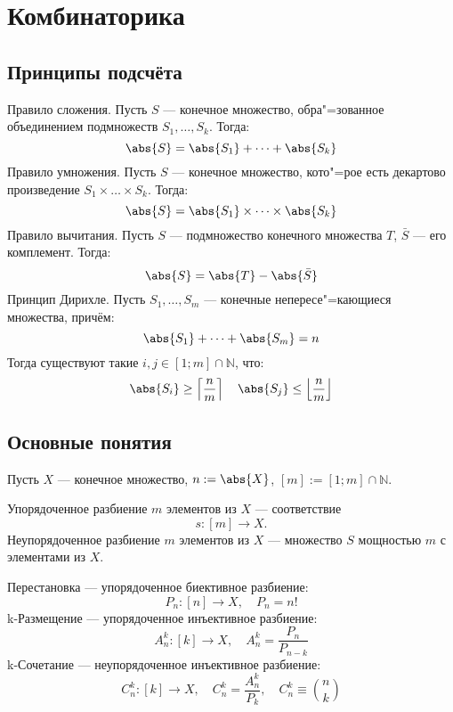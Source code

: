 \section{Комбинаторика}





\subsection{Принципы подсчёта}

{\bold Правило сложения.} Пусть $S$ --- конечное множество, обра"=зованное объединением подмножеств $S_1,\dots,S_k$. Тогда:
$$\abs{S}=\abs{S_1}+\dots+\abs{S_k}$$
{\bold Правило умножения.} Пусть $S$ --- конечное множество, кото"=рое есть декартово произведение $S_1\times\dots\times S_k$. Тогда:
$$\abs{S}=\abs{S_1}\times\dots\times\abs{S_k}$$
{\bold Правило вычитания.} Пусть $S$ --- подмножество конечного множества $T$, $\bar{S}$ --- его комплемент. Тогда:
$$\abs{S}=\abs{T}-\abs{\bar{S}}$$
{\bold Принцип Дирихле.} Пусть $S_1,\dots,S_m$ --- конечные непересе"=кающиеся множества, причём:
$$\abs{S_1}+\dots+\abs{S_m}=n$$
Тогда существуют такие $i,j\in[1;m]\cap\mathbb{N}$, что:
$$\abs{S_i}\geq\left\lceil\frac{n}{m}\right\rceil\quad\abs{S_j}\leq\left\lfloor\frac{n}{m}\right\rfloor$$

\subsection{Основные понятия}

Пусть $X$ --- конечное множество, $n:=\abs{X}$, $[m]:=[1;m]\cap\mathbb{N}$.

{\ital Упорядоченное разбиение} $m$ элементов из $X$ --- соответствие
$$s\colon[m]\to X.$$
{\ital Неупорядоченное разбиение} $m$ элементов из $X$ --- множество $S$ мощностью $m$ с элементами из $X$.

{\ital Перестановка} --- упорядоченное биективное разбиение:
$$P_n\colon[n]\to X,\quad P_n=n!$$
{\ital k-Размещение} --- упорядоченное инъективное разбиение:
$$A_n^k\colon[k]\to X,\quad A_n^k=\frac{P_n}{P_{n-k}}$$
{\ital k-Сочетание} --- неупорядоченное инъективное разбиение:
$$C_n^k\colon[k]\to X,\quad C_n^k=\frac{A_n^k}{P_k},\quad C_n^k\equiv{\textstyle\binom{n}{k}}$$

